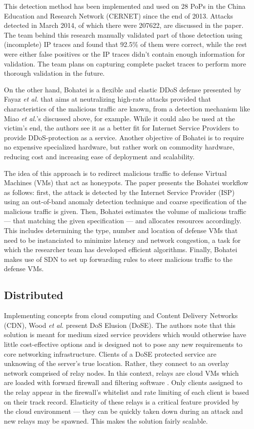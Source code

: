 \documentclass[conference]{IEEEtran}
\begin{document}
This detection method has been implemented and used on 28 PoPs in the China Education and Research Network (CERNET) since the end of 2013. Attacks detected in March 2014, of which there were 207622, are discussed in the paper. The team behind this research manually validated part of those detection using (incomplete) IP traces and found that 92.5\% of them were correct, while the rest were either false positives or the IP traces didn't contain enough information for validation. The team plans on capturing complete packet traces to perform more thorough validation in the future.

On the other hand, Bohatei \cite{Bohatei:Fayaz} is a flexible and elastic DDoS defense presented by Fayaz \textit{et al.} that aims at neutralizing high-rate attacks provided that characteristics of the malicious traffic are known, from a detection mechanism like Miao \textit{et al.}'s discussed above, for example. While it could also be used at the victim's end, the authors see it as a better fit for Internet Service Providers to provide DDoS-protection as a service. Another objective of Bohatei is to require no expensive specialized hardware, but rather work on commodity hardware, reducing cost and increasing ease of deployment and scalability.

The idea of this approach is to redirect malicious traffic to defense Virtual Machines (VMs) that act as honeypots. The paper presents the Bohatei workflow as follows: first, the attack is detected by the Internet Service Provider (ISP) using an out-of-band anomaly detection technique and coarse specification of the malicious traffic is given. Then, Bohatei estimates the volume of malicious traffic --- that matching the given specification --- and allocates resources accordingly. This includes determining the type, number and location of defense VMs that need to be instanciated to minimize latency and network congestion, a task for which the researcher team has developed efficient algorithms. Finally, Bohatei makes use of SDN to set up forwarding rules to steer malicious traffic to the defense VMs.

\subsection{Distributed}
Implementing concepts from cloud computing and Content Delivery Networks (CDN), Wood \textit{et al.} present DoS Elusion (DoSE). The authors note that this solution is meant for medium sized service providers which would otherwise have little cost-effective options and is designed not to pose any new requirements to core networking infrastructure. Clients of a DoSE protected service are unknowing of the server's true location. Rather, they connect to an overlay network comprised of relay nodes. In this context, relays are cloud VMs which are loaded with forward firewall and filtering software \cite{Wood:DoSE}. Only clients assigned to the relay appear in the firewall's whitelist and rate limiting of each client is based on their track record. Elasticity of these relays is a critical feature provided by the cloud environment --- they can be quickly taken down during an attack and new relays may be spawned. This makes the solution fairly scalable.
\end{document}
